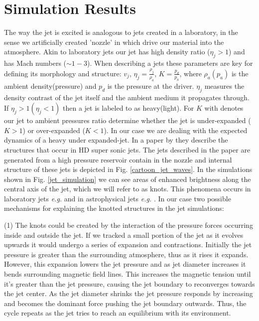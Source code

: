 \documentclass[12pt]{ociamthesis}
\newcommand{\fref}[1]{Fig. \eqref{#1}}
\begin{document}
\section{Simulation Results}
The way the jet is excited is analogous to jets created in a laboratory, in the sense we artificially created 'nozzle' in which drive our material into the atmosphere. Akin to laboratory jets our jet has high density ratio ($\eta_j >1$) and has Mach numbers ($\sim 1-3$). When describing a jets these parameters are key for defining its morphology and structure: $v_j$, $\eta_j = \frac{\rho_j}{\rho_a}$, $K = \frac{p_{d}}{p_a}$, where $\rho_a(p_a)$ is the ambient density(pressure) and $p_{d}$ is the pressure at the driver. $\eta_j$ measures the density contrast of the jet itself and the ambient medium it propagates through. If $\eta_j>1(\eta_j<1)$ then a jet is labeled to as heavy(light). For $K$ with denotes our jet to ambient pressures ratio determine whether the jet is under-expanded ($K>1$) or over-expanded ($K<1$). In our case we are dealing with the expected dynamics of a heavy under expanded-jet. In a paper by \cite{Norman1982} they describe the structures that occur in HD super sonic jets. The jets described in the paper are generated from a high pressure reservoir contain in the nozzle and internal structure of these jets is depicted in \fref{cartoon_jet_waves}. In the simulations shown in \fref{jet_simulation} we can see areas of enhanced brightness along the central axis of the jet, which we will refer to as knots. This phenomena occurs in laboratory jets \textit{e.g.} \citep{Ono2014,Edgington-Mitchell2014,Menon2010} and in astrophysical jets \textit{e.g.} \cite{Blandford2019,Belan2011,DeGouveiaDalPino2005,Birkinshaw1996}. In our case two possible mechanisms for explaining the knotted structures in the jet simulations: \\
\par (1) The knots could be created by the interaction of the pressure forces occurring inside and outside the jet. If we tracked a small portion of the jet as it evolves upwards it would undergo a series of expansion and contractions. Initially the jet pressure is greater than the surrounding atmosphere, thus as it rises it expands. However, this expansion lowers the jet pressure and as jet diameter increases it bends surrounding magnetic field lines. This increases the magnetic tension until it's greater than the jet pressure, causing the jet boundary to reconverges towards the jet center. As the jet diameter shrinks the jet pressure responds by increasing and becomes the dominant force pushing the jet boundary outwards. Thus, the cycle repeats as the jet tries to reach an equilibrium with its environment. \\
\end{document}
